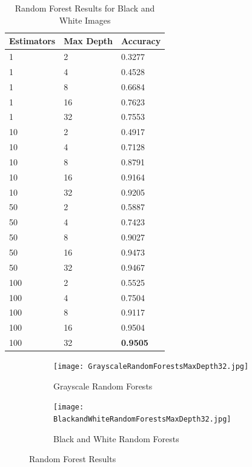 \documentclass[12pt]{article}
\begin{document}
\begin{table}[H]
\centering
\caption{Random Forest Results for Black and White Images}
    \begin{tabular}{|l|l|l|}
    \hline
    Estimators & Max Depth & Accuracy \\ \hline
    1          & 2         & 0.3277   \\ \hline
    1          & 4         & 0.4528   \\ \hline
    1          & 8         & 0.6684   \\ \hline
    1          & 16        & 0.7623   \\ \hline
    1          & 32        & 0.7553   \\ \hline
    10         & 2         & 0.4917   \\ \hline
    10         & 4         & 0.7128   \\ \hline
    10         & 8         & 0.8791   \\ \hline
    10         & 16        & 0.9164   \\ \hline
    10         & 32        & 0.9205   \\ \hline
    50         & 2         & 0.5887   \\ \hline
    50         & 4         & 0.7423   \\ \hline
    50         & 8         & 0.9027   \\ \hline
    50         & 16        & 0.9473   \\ \hline
    50         & 32        & 0.9467   \\ \hline
    100        & 2         & 0.5525    \\ \hline
    100        & 4         & 0.7504   \\ \hline
    100        & 8         & 0.9117   \\ \hline
    100        & 16        & 0.9504   \\ \hline
    100        & 32        & \textbf{0.9505}   \\ \hline
    \end{tabular}
\end{table}

\begin{figure}[h]
\centering
\begin{subfigure}{.45\textwidth}
  \centering
  \texttt{[image: GrayscaleRandomForestsMaxDepth32.jpg]}
  \caption{Grayscale Random Forests}
  \label{fig:sub1}
\end{subfigure}%
\hspace{2mm}
\begin{subfigure}{.45\textwidth}
  \centering
  \texttt{[image: BlackandWhiteRandomForestsMaxDepth32.jpg]}
  \caption{Black and White Random Forests}
  \label{fig:sub2}
\end{subfigure}
\caption{Random Forest Results}
\label{fig:test}
\end{figure}
\end{document}
